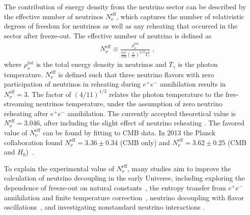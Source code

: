 The contribution of energy density from the neutrino sector can be described by the effective number of neutrinos $N_{\nu}^{\mathrm{eff}}$, which captures the number of relativistic degrees of freedom for neutrinos as well as any reheating that occurred in the sector after freeze-out. The effective number of neutrino is defined as 
\begin{align}\label{Neff}
N_\nu^{\mathrm{eff}}\equiv\frac{\rho^{\mathrm{tot}}_\nu}{\frac{7\pi^2}{120}\left(\frac{4}{11}\right)^{4/3}T_\gamma^4}\;,
\end{align}
where $\rho_\nu^{\mathrm{tot}}$ is the total energy density in neutrinos and $T_\gamma$ is the photon temperature. $N_\nu^{\mathrm{eff}}$ is defined such that three neutrino flavors with zero participation of neutrinos in reheating during $e^+e^-$ annihilation results in $N_\nu^{\mathrm{eff}}=3$. The factor of $\left(4/11\right)^{1/3}$ relates the photon temperature to the free-streaming neutrinos temperature, under the assumption of zero neutrino reheating after $e^+e^-$ annihilation. The currently accepted theoretical value is $N_\nu^{\mathrm{eff}}=3.046$, after including the slight effect of neutrino reheating \cite{Mangano:2005cc,Birrell:2014uka}. The favored value of $N_\nu^{\mathrm{eff}}$ can be found by fitting to CMB data. In 2013 the Planck collaboration found $N_\nu^{\mathrm{eff}}=3.36\pm0.34$ (CMB only) and $N_\nu^{\mathrm{eff}}= 3.62\pm0.25$ (CMB and $H_0$)~\cite{Planck:2013pxb}.

To explain the experimental value of $N_\nu^{\mathrm{eff}}$, many studies aim to improve the calculation of neutrino decoupling in the early Universe, including exploring the dependence of freeze-out on natural constants~\cite{Birrell:2014uka}, the entropy transfer from $e^+e^-$ annihilation and finite temperature correction~\cite{Dicus:1982bz,Heckler:1994tv,Fornengo:1997wa}, neutrino decoupling with flavor oscillations~\cite{Mangano:2001iu,Mangano:2005cc}, and investigating nonstandard neutrino interactions \cite{Morgan:1981zy,Fukugita:1987uy,Elmfors:1997tt,Vogel:1989iv,Mangano:2006ar,Giunti:2008ve,Mangano:2006ar}.


